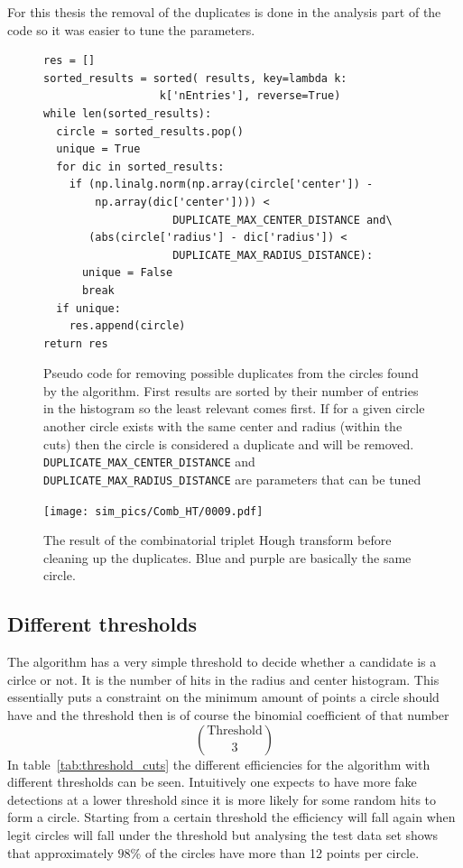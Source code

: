 \documentclass[11pt,twoside]{scrreprt}
\begin{document}
For this thesis the removal of the duplicates is done in the analysis part of the code so it was easier to tune the parameters.
\begin{figure}[htb]
\centering
  \begin{lstlisting}
res = []
sorted_results = sorted( results, key=lambda k: 
                  k['nEntries'], reverse=True)
while len(sorted_results):
  circle = sorted_results.pop()
  unique = True
  for dic in sorted_results:
    if (np.linalg.norm(np.array(circle['center']) - 
        np.array(dic['center']))) < 
                    DUPLICATE_MAX_CENTER_DISTANCE and\
       (abs(circle['radius'] - dic['radius']) < 
                    DUPLICATE_MAX_RADIUS_DISTANCE):
      unique = False
      break
  if unique:
    res.append(circle)
return res
\end{lstlisting}
\caption[Pseudo code for removing possible duplicates]{Pseudo code for removing possible duplicates from the circles found by the algorithm. First results are sorted by their number of entries
in the histogram so the least relevant comes first. If for a given circle another circle exists with the same center and radius (within the cuts)
then the circle is considered a duplicate and will be removed. \texttt{DUPLICATE\_MAX\_CENTER\_DISTANCE} and \texttt{DUPLICATE\_MAX\_RADIUS\_DISTANCE} are 
parameters that can be tuned}\label{fig:dup_code}
\end{figure}


\begin{figure}[htb]
  \centering
  \texttt{[image: sim\_pics/Comb\_HT/0009.pdf]}
  \caption{The result of the combinatorial triplet Hough transform before cleaning up the duplicates. Blue and purple are basically the same circle.}
  \label{fig:comb_ht_0009}
\end{figure}

\subsection{Different thresholds} %
\label{sub:different_thresholds}
The algorithm has a very simple threshold to decide whether a candidate is a cirlce or not. It is the number of hits in the radius and center histogram.
This essentially puts a constraint on the minimum amount of points a circle should have and the threshold then is of course the binomial
coefficient of that number
\[
  \binom{\text{Threshold}}{3}
\]
In table~\ref{tab:threshold_cuts} the different efficiencies for the algorithm with different thresholds can be seen. Intuitively one expects to have more fake
detections at a lower threshold since it is more likely for some random hits to form a circle. Starting from a certain threshold the efficiency
will fall again when legit circles will fall under the threshold but analysing the test data set shows that approximately $98\%$ of the circles have more
than 12 points per circle.
\end{document}
